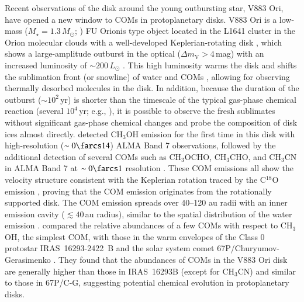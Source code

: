\documentclass[twocolumn, twocolappendix, astrosymb, times]{aastex631}
\newcommand{\methanol}{CH$_3$OH\xspace}
\newcommand{\acetaldehyde}{CH$_3$CHO\xspace}
\newcommand{\methylformate}{CH$_3$OCHO\xspace}
\begin{document}
Recent observations of the disk around the young outbursting star, V883 Ori, have opened a new window to COMs in protoplanetary disks. V883 Ori is a low-mass ($M_\star = 1.3\,M_\odot$; \citealt{Cieza2016}) FU Orionis type object located in the L1641 cluster in the Orion molecular clouds \citep[$d\approx400$\,pc;][]{Strom1993} with a well-developed Keplerian-rotating disk \citep{Cieza2016}, which shows a large-amplitude outburst in the optical ($\Delta m_\mathrm{V} > 4$\,mag) with an increased luminosity of $\sim200\,L_\odot$ \citep{Furlan2016}. This high luminosity warms the disk and shifts the sublimation front (or snowline) of water and COMs \citep{Tobin2023}, allowing for observing thermally desorbed molecules in the disk. In addition, because the duration of the outburst ($\sim10^2$\,yr) is shorter than the timescale of the typical gas-phase chemical reaction (several $10^4$\,yr; e.g., \citealt{Nomura2009}), it is possible to observe the fresh sublimates without significant gas-phase chemical changes and probe the composition of disk ices almost directly. 
\citet{vantHoff2018} detected \methanol emission for the first time in this disk with high-resolution ($\sim0\farcs14$) ALMA Band 7 observations, followed by the additional detection of several COMs such as \methylformate, \acetaldehyde, and CH$_3$CN in ALMA Band 7 at $\sim0\farcs1$ resolution \citep{Lee2019}. These COM emissions all show the velocity structure consistent with the Keplerian rotation traced by the C$^{18}$O emission \citep{Cieza2016, vantHoff2018}, proving that the COM emission originates from the rotationally supported disk. The COM emission spreads over 40--120 au radii with an inner emission cavity ($\lesssim40$\,au radius), similar to the spatial distribution of the water emission \citep{Tobin2023}. \citet{Lee2019} compared the relative abundances of a few COMs with respect to \methanol, the simplest COM, with those in the warm envelopes of the Class 0 protostar IRAS~16293-2422~B \citep[hereafter IRAS~16293B; e.g.,][]{Jorgensen2016} and the solar system comet 67P/Churyumov-Gerasimenko \citep[hereafter 67P/C-G; e.g.,][]{Altwegg2019}. They found that the abundances of COMs in the V883 Ori disk are generally higher than those in IRAS~16293B (except for CH$_3$CN) and similar to those in 67P/C-G, suggesting potential chemical evolution in protoplanetary disks.
\end{document}
